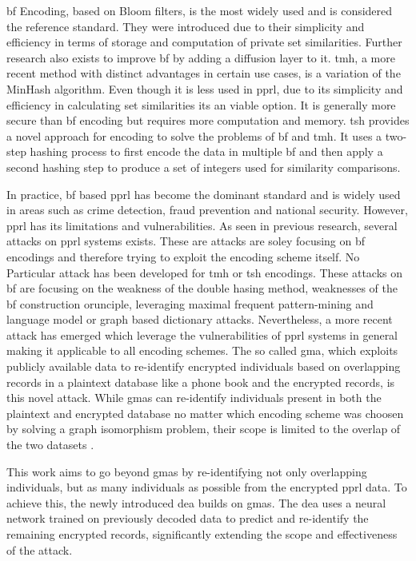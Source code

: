 \ac{bf} Encoding, based on Bloom filters, is the most widely used and is considered the reference standard. 
They were introduced due to their simplicity and efficiency in terms of storage and computation of private set similarities. 
Further research also exists to improve \ac{bf} by adding a diffusion layer to it.  %
\ac{tmh}, a more recent method with distinct advantages in certain use cases, is a variation of the MinHash algorithm. 
Even though it is less used in \ac{pprl}, due to its simplicity and efficiency in calculating set similarities its an viable option. 
It is generally more secure than \ac{bf} encoding but requires more computation and memory. 
\ac{tsh} provides a novel approach for encoding to solve the problems of \ac{bf} and \ac{tmh}.
It uses a two-step hashing process to first encode the data in multiple \ac{bf} and then apply a second hashing step to produce a set of integers used for similarity comparisons.
\cite{vidanage2024, schaefer2024}

In practice, \ac{bf} based \ac{pprl} has become the dominant standard and is widely used in areas such as crime detection, fraud prevention and national security.
However, \ac{pprl} has its limitations and vulnerabilities.
As seen in previous research, several attacks on \ac{pprl} systems exists.
These are attacks are soley focusing on \ac{bf} encodings and therefore trying to exploit the encoding scheme itself.
No Particular attack has been developed for \ac{tmh} or \ac{tsh} encodings.
These attacks on \ac{bf} are focusing on the weakness of the double hasing method, weaknesses of the \ac{bf} construction orunciple, leveraging maximal frequent pattern-mining and language model or graph based dictionary attacks. \cite{vidanage2024}
Nevertheless, a more recent attack has emerged which leverage the vulnerabilities of \ac{pprl} systems in general making it applicable to all encoding schemes.
The so called \ac{gma}, which exploits publicly available data to re-identify encrypted individuals based on overlapping records in a plaintext database like a phone book and the encrypted records, is this novel attack. \cite{vidanage2024, schaefer2024}
While \ac{gma}s can re-identify individuals present in both the plaintext and encrypted database no matter which encoding scheme was choosen by solving a graph isomorphism problem, their scope is limited to the overlap of the two datasets \cite{schaefer2024}.

This work aims to go beyond \ac{gma}s by re-identifying not only overlapping individuals, but as many individuals as possible from the encrypted \ac{pprl} data.
To achieve this, the newly introduced \ac{dea} builds on \ac{gma}s.
The \ac{dea} uses a neural network trained on previously decoded data to predict and re-identify the remaining encrypted records, significantly extending the scope and effectiveness of the attack. 


